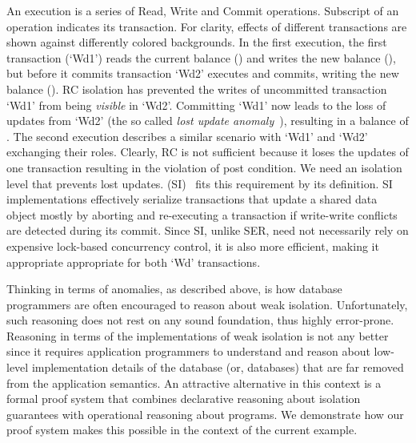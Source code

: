 An execution is a series of Read, Write and Commit operations.
Subscript of an operation indicates its transaction. For clarity,
effects of different transactions are shown against differently
colored backgrounds. In the first execution, the first transaction
(`Wd1') reads the current balance () and writes the new balance
(), but before it commits transaction `Wd2' executes and
commits, writing the new balance (). RC isolation has
prevented the writes of uncommitted transaction `Wd1' from being
\emph{visible} in `Wd2'. Committing `Wd1' now leads to the loss of
updates from `Wd2' (the so called \emph{lost update
anomaly}~\cite{berenson}), resulting in a balance of . The
second execution describes a similar scenario with `Wd1' and `Wd2'
exchanging their roles. Clearly, RC is not sufficient because it loses
the updates of one transaction resulting in the violation of post
condition.  We need an isolation level that prevents lost updates.
 (SI)~\cite{berenson} fits this requirement by
its definition. SI implementations effectively serialize transactions
that update a shared data object mostly by aborting and re-executing a
transaction if write-write conflicts are detected during its commit.
Since SI, unlike SER, need not necessarily rely on expensive
lock-based concurrency control, it is also more efficient, making it
appropriate appropriate for both `Wd' transactions. 

Thinking in terms of anomalies, as described above, is how database
programmers are often encouraged to reason about weak isolation.
Unfortunately, such reasoning does not rest on any sound foundation,
thus highly error-prone. Reasoning in terms of the implementations of
weak isolation is not any better since it requires application
programmers to understand and reason about low-level implementation
details of the database (or, databases) that are far removed from the
application semantics. An attractive alternative in this context is a
formal proof system that combines declarative reasoning about
isolation guarantees with operational reasoning about programs. We
demonstrate how our proof system makes this possible in the context of
the current example.


